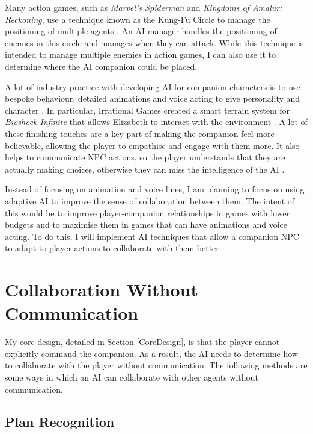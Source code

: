 \documentclass{IEEEtran}
\begin{document}
Many action games, such as \textit{Marvel's Spiderman} and \textit{Kingdoms of Amalur: Reckoning}, use a technique known as the Kung-Fu Circle to manage the positioning of multiple agents \cite{GAIPKungFuCircle, GDCSpiderman}. An AI manager handles the positioning of enemies in this circle and manages when they can attack. While this technique is intended to manage multiple enemies in action games, I can also use it to determine where the AI companion could be placed.

A lot of industry practice with developing AI for companion characters is to use bespoke behaviour, detailed animations and voice acting to give personality and character \cite{GAIP2EllieAI, GMTGoodAI, GAIPOReactions}. In particular, Irrational Games created a smart terrain system for \textit{Bioshock Infinite} that allows Elizabeth to interact with the environment \cite{GDCElizabeth, AIGamesBioshockAI}. A lot of these finishing touches are a key part of making the companion feel more believable, allowing the player to empathise and engage with them more. It also helps to communicate NPC actions, so the player understands that they are actually making choices, otherwise they can miss the intelligence of the AI \cite{GMTGoodAI}.

Instead of focusing on animation and voice lines, I am planning to focus on using adaptive AI to improve the sense of collaboration between them. The intent of this would be to improve player-companion relationships in games with lower budgets and to maximise them in games that can have animations and voice acting. To do this, I will implement AI techniques that allow a companion NPC to adapt to player actions to collaborate with them better.

\section{Collaboration Without Communication}
\label{Communication}

My core design, detailed in Section \ref{CoreDesign}, is that the player cannot explicitly command the companion. As a result, the AI needs to determine how to collaborate with the player without communication. The following methods are some ways in which an AI can collaborate with other agents without communication.

\subsection{Plan Recognition}
\label{PlanRecognition}
\end{document}
